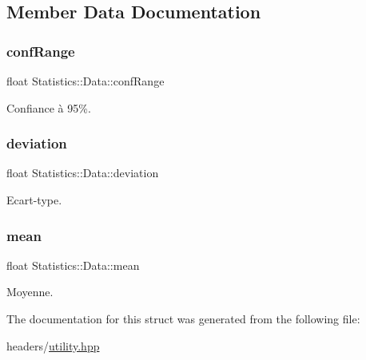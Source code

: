 \subsection{Member Data Documentation}
\mbox{\label{structStatistics_1_1Data_a098a51c15f9d1c2b0d50fd89fc956c06}} 
\subsubsection{\texorpdfstring{conf\+Range}{confRange}}
{\footnotesize\ttfamily float Statistics\+::\+Data\+::conf\+Range}



Confiance à 95\%. 

\mbox{\label{structStatistics_1_1Data_a4ab98072b8f7055a828ea80077a059f0}} 
\subsubsection{\texorpdfstring{deviation}{deviation}}
{\footnotesize\ttfamily float Statistics\+::\+Data\+::deviation}



Ecart-\/type. 

\mbox{\label{structStatistics_1_1Data_a70c674f35bce1803c894c1df2649ac3f}} 
\subsubsection{\texorpdfstring{mean}{mean}}
{\footnotesize\ttfamily float Statistics\+::\+Data\+::mean}



Moyenne. 



The documentation for this struct was generated from the following file\+:\begin{DoxyCompactItemize}
\item 
headers/\hyperlink{utility_8hpp}{utility.\+hpp}\end{DoxyCompactItemize}
